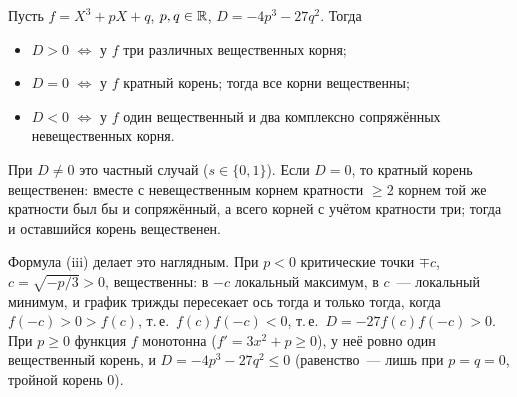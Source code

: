 \begin{example}
Пусть $f=X^3+pX+q$, $p,q\in\mathbb R$, $D=-4p^3-27q^2$. Тогда
\begin{itemize}[leftmargin=*]
\item $D>0$ $\iff$ у $f$ три различных вещественных корня;
\item $D=0$ $\iff$ у $f$ кратный корень; тогда все корни вещественны;
\item $D<0$ $\iff$ у $f$ один вещественный и два комплексно сопряжённых невещественных корня.
\end{itemize}
При $D\ne0$ это частный случай  ($s\in\{0,1\}$). Если $D=0$, то кратный корень вещественен: вместе с невещественным
корнем кратности $\ge2$ корнем той же кратности был бы и сопряжённый, а всего корней с учётом кратности три; тогда и
оставшийся корень вещественен.

Формула (iii) делает это наглядным. При $p<0$ критические точки $\mp c$, $c=\sqrt{-p/3}>0$, вещественны: в $-c$
локальный максимум, в $c$~--- локальный минимум, и график трижды пересекает ось тогда и только тогда, когда
$f(-c)>0>f(c)$, т.\,е.\ $f(c)f(-c)<0$, т.\,е.\ $D=-27f(c)f(-c)>0$. При $p\ge0$ функция $f$ монотонна ($f'=3x^2+p\ge0$), у неё
ровно один вещественный корень, и $D=-4p^3-27q^2\le0$ (равенство~--- лишь при $p=q=0$, тройной корень $0$).
\end{example}

